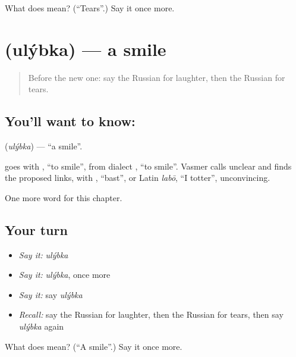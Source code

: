 \begin{tcolorbox}[breakable,colback=teal!4,colframe=teal!35!black,title={Before you move on}]
What does  mean? (\textquotedblleft{}Tears\textquotedblright{}.) Say it once more.
\end{tcolorbox}
\section[\texorpdfstring{\ru{улыбка} (ulýbka)}{улыбка (ulýbka)}]{ (ulýbka) — a smile}

\label{lesson:RU-C200-ulybka}



\begin{quote}
Before the new one: say the Russian for laughter, then the Russian for tears.
\end{quote}

\subsection*{You'll want to know: }
\textbf{} (\emph{ulýbka}) — \textquotedblleft{}a smile\textquotedblright{}.

\begin{cousinweb}
\textbf{} goes with \emph{}, \textquotedblleft{}to smile\textquotedblright{}, from dialect \emph{}, \textquotedblleft{}to smile\textquotedblright{}. Vasmer calls \emph{} unclear and finds the proposed links, with \emph{}, \textquotedblleft{}bast\textquotedblright{}, or Latin \emph{labō}, \textquotedblleft{}I totter\textquotedblright{}, unconvincing.
\end{cousinweb}

\begin{grammarlens}[title={What you've built}]
One more word for this chapter.
\end{grammarlens}

\subsection*{Your turn}
\begin{itemize}
\raggedright
  \item \emph{Say it:} \emph{ulýbka}
  \item \emph{Say it:} \emph{ulýbka}, once more
  \item \emph{Say it:} say \emph{ulýbka}
  \item \emph{Recall:} say the Russian for laughter, then the Russian for tears, then say \emph{ulýbka} again
\end{itemize}

\begin{tcolorbox}[breakable,colback=teal!4,colframe=teal!35!black,title={Before you move on}]
What does  mean? (\textquotedblleft{}A smile\textquotedblright{}.) Say it once more.
\end{tcolorbox}
